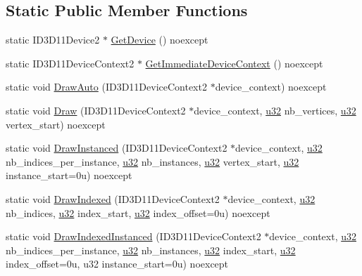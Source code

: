 \subsection*{Static Public Member Functions}
\begin{DoxyCompactItemize}
\item 
static I\+D3\+D11\+Device2 $\ast$ \hyperlink{structmage_1_1_pipeline_a5ee450d9d2a1dc333c7491a13376dca3}{Get\+Device} () noexcept
\item 
static I\+D3\+D11\+Device\+Context2 $\ast$ \hyperlink{structmage_1_1_pipeline_af3a32798924091ccd874121889338163}{Get\+Immediate\+Device\+Context} () noexcept
\item 
static void \hyperlink{structmage_1_1_pipeline_a5f7752ae2ada0e9b1f46b3f0c7a00ba5}{Draw\+Auto} (I\+D3\+D11\+Device\+Context2 $\ast$device\+\_\+context) noexcept
\item 
static void \hyperlink{structmage_1_1_pipeline_a088e075f66cd26b5fd707cef762be8ce}{Draw} (I\+D3\+D11\+Device\+Context2 $\ast$device\+\_\+context, \hyperlink{namespacemage_af2b398bf98eb10351f49cad73fe2cc73}{u32} nb\+\_\+vertices, \hyperlink{namespacemage_af2b398bf98eb10351f49cad73fe2cc73}{u32} vertex\+\_\+start) noexcept
\item 
static void \hyperlink{structmage_1_1_pipeline_a39b2910fcf34e92b01d85092d5cc89fd}{Draw\+Instanced} (I\+D3\+D11\+Device\+Context2 $\ast$device\+\_\+context, \hyperlink{namespacemage_af2b398bf98eb10351f49cad73fe2cc73}{u32} nb\+\_\+indices\+\_\+per\+\_\+instance, \hyperlink{namespacemage_af2b398bf98eb10351f49cad73fe2cc73}{u32} nb\+\_\+instances, \hyperlink{namespacemage_af2b398bf98eb10351f49cad73fe2cc73}{u32} vertex\+\_\+start, \hyperlink{namespacemage_af2b398bf98eb10351f49cad73fe2cc73}{u32} instance\+\_\+start=0u) noexcept
\item 
static void \hyperlink{structmage_1_1_pipeline_a1df1921e82767faf760fa42198ca90fb}{Draw\+Indexed} (I\+D3\+D11\+Device\+Context2 $\ast$device\+\_\+context, \hyperlink{namespacemage_af2b398bf98eb10351f49cad73fe2cc73}{u32} nb\+\_\+indices, \hyperlink{namespacemage_af2b398bf98eb10351f49cad73fe2cc73}{u32} index\+\_\+start, \hyperlink{namespacemage_af2b398bf98eb10351f49cad73fe2cc73}{u32} index\+\_\+offset=0u) noexcept
\item 
static void \hyperlink{structmage_1_1_pipeline_a99df3a889aa57ae6b36255a478087426}{Draw\+Indexed\+Instanced} (I\+D3\+D11\+Device\+Context2 $\ast$device\+\_\+context, \hyperlink{namespacemage_af2b398bf98eb10351f49cad73fe2cc73}{u32} nb\+\_\+indices\+\_\+per\+\_\+instance, \hyperlink{namespacemage_af2b398bf98eb10351f49cad73fe2cc73}{u32} nb\+\_\+instances, \hyperlink{namespacemage_af2b398bf98eb10351f49cad73fe2cc73}{u32} index\+\_\+start, \hyperlink{namespacemage_af2b398bf98eb10351f49cad73fe2cc73}{u32} index\+\_\+offset=0u, u32 instance\+\_\+start=0u) noexcept

\end{DoxyCompactItemize}
